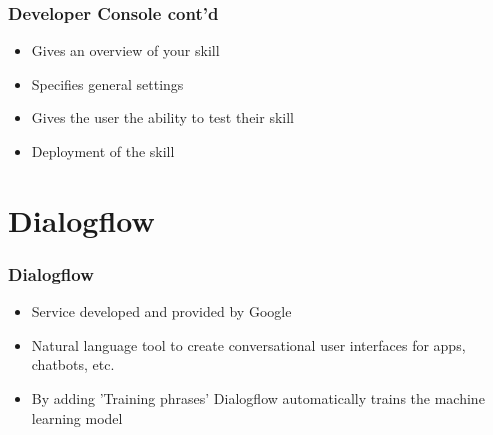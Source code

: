 \documentclass{beamer}
\begin{document}
\begin{frame}
\frametitle{Developer Console cont'd}
\begin{center}
\begin{itemize}
\item Gives an overview of your skill
\item Specifies general settings
\item Gives the user the ability to test their skill
\item Deployment of the skill
\end{itemize}
\end{center}
\end{frame}


\section{Dialogflow}

\begin{frame}
\frametitle{Dialogflow}
\begin{center}
\begin{itemize}
\item Service developed and provided by Google
\item Natural language tool to create conversational user interfaces for apps, chatbots, etc.
\item By adding 'Training phrases' Dialogflow automatically trains the machine learning model
\end{itemize}
\end{center}
\end{frame}


\end{document}
